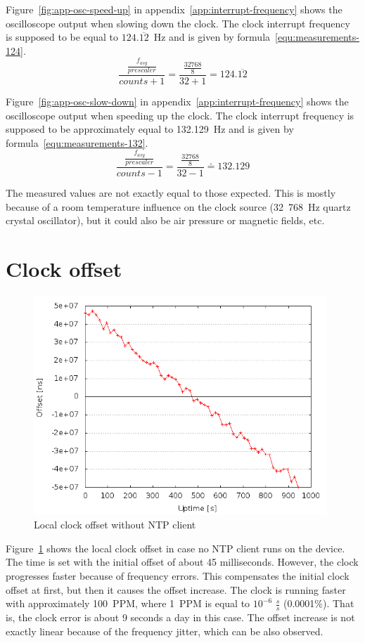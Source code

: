 Figure~\ref{fig:app-osc-speed-up} in appendix~\ref{app:interrupt-frequency} shows the oscilloscope output
when slowing down the clock.
The clock interrupt frequency
is supposed to be equal to $124.\overline{12}$~Hz and is given by formula~\ref{equ:measurements-124}.
\begin{equation}
\label{equ:measurements-124}
\frac{\frac{f_{asy}}{prescaler}}{counts + 1} = \frac{\frac{32768}{8}}{32+1} = 124.\overline{12}
\end{equation}

Figure~\ref{fig:app-osc-slow-down} in appendix~\ref{app:interrupt-frequency} shows the oscilloscope output
when speeding up the clock.
The clock interrupt frequency
is supposed to be approximately equal to 132.129~Hz and is given by formula~\ref{equ:measurements-132}.
\begin{equation}
\label{equ:measurements-132}
\frac{\frac{f_{asy}}{prescaler}}{counts - 1} = \frac{\frac{32768}{8}}{32-1} \doteq 132.129
\end{equation}

The measured values are not exactly equal to those expected.
This is mostly because of a room temperature influence on the clock source
(32~768~Hz quartz crystal oscillator),
but it could also be air pressure or magnetic fields, etc.

\section{Clock offset}
\begin{figure}[H]
  \centering
  \includegraphics[width=11cm,keepaspectratio]{fig/no-ntp.png}
  \caption{Local clock offset without NTP client}
  \label{fig:measurements-no-ntp}
\end{figure}
Figure~\ref{fig:measurements-no-ntp} shows the local clock offset
in case no NTP client runs on the device.
The time is set with the initial offset of about 45 milliseconds.
However, the clock progresses faster because of frequency errors.
This compensates the initial clock offset at first,
but then it causes the offset increase.
The clock is running faster with approximately 100~PPM,
where 1~PPM is equal to $10^{-6}$ $\frac{s}{s}$ (0.0001\%).
That is, the clock error is about 9 seconds a day in this case.
The offset increase is not exactly linear because of the frequency jitter,
which can be also observed.

